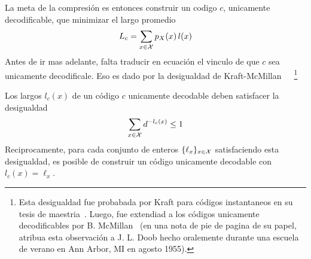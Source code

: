 La  meta de  la compresi\'on  es entonces  construir un  codigo  $c$, unicamente
decodificable, que minimizar el largo promedio
%
\[
L_c = \sum_{x \in \mathcal{X}} p_X(x) \, l(x)
\]
%
Antes de ir mas adelante, falta traducir en ecuaci\'on el vinculo de que $c$ sea
unicamente    decodificale.    Eso    es    dado   por    la   desigualdad    de
Kraft-McMillan~~\cite{Kra49,   McM56,   Kar61}~\footnote{Esta  desigualdad   fue
  probabada   por   Kraft  para   c\'odigos   instantaneos   en   su  tesis   de
  maestria~\cite{Kra49}.  Luego,  fue   extendiad  a  los  c\'odigos  unicamente
  decodificables por B.  McMillan~\cite{McM56} (en una nota de  pie de pagina de
  su papel,  atribua esta observaci\'on a  J.  L. Doob  hecho oralemente durante
  una escuela de verano en Ann Arbor, MI en agosto 1955).}
%
\begin{teorema}
  Los largos $l_c(x)$  de un c\'odigo $c$ unicamente  decodable deben satisfacer
  la desigualdad
  \[
  \sum_{x \in \mathcal{X}} d^{-l_c(x)} \le 1
  \]
  Reciprocamente,  para cada  conjunto  de  enteros $\{  \ell_x  \}_{x \in  \mathcal{X}}$
  satisfaciendo esta desigualdad, es posible de construir un c\'odigo unicamente
  decodable con $l_c(x) = \ell_x$.
\end{teorema}
%
